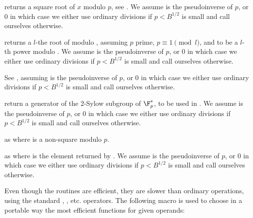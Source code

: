  returns a square root
of $x$ modulo $p$, see . We assume  is the
pseudoinverse of $p$, or $0$ in which case we either use ordinary divisions
if $p < B^{1/2}$ is small and call  ourselves otherwise.

returns a $l$-the root of  modulo , assuming
$p$ prime, $p \equiv 1 \pmod{l}$, and  to be a $l$-th power modulo
. We assume  is the pseudoinverse of $p$, or $0$ in which case
we either use ordinary divisions if $p < B^{1/2}$ is small and call
 ourselves otherwise.

See , assuming  is the pseudoinverse of $p$, or $0$ in
which case we either use ordinary divisions if $p < B^{1/2}$ is small and
call  ourselves otherwise.

 return a generator of
the $2$-Sylow subgroup of $\F_p^*$, to be used in .
We assume  is the pseudoinverse of $p$, or $0$ in which case we
either use ordinary divisions if $p < B^{1/2}$ is small and call
 ourselves otherwise.

as  where  is a non-square modulo $p$.

as  where  is the element returned by
. We assume  is the pseudoinverse of $p$, or $0$
in which case we either use ordinary divisions if $p < B^{1/2}$ is small and
call  ourselves otherwise.


Even though the  routines are efficient, they are slower than
ordinary  operations, using the standard \kbd{+}, \kbd{\%}, etc.
operators.
The following macro is used to choose in a portable way the most efficient
functions for given operands:

